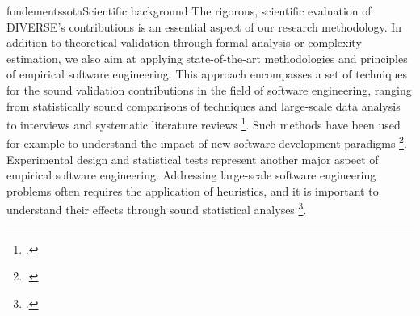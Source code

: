 \documentclass{ra2018}
\newcommand{\team}{DIVERSE}
\begin{document}
\begin{module}{fondements}{sota}{Scientific background}
The rigorous, scientific evaluation of \team{}'s contributions is an essential aspect of our research methodology. In addition to theoretical validation through formal analysis or complexity estimation, we also aim at applying state-of-the-art methodologies and principles of empirical software engineering. This approach encompasses a set of techniques for the sound validation contributions in the field of software engineering, ranging from statistically sound comparisons of techniques and large-scale data analysis to interviews and systematic literature reviews   \footcite{shull2008guide, runeson2009guidelines}. Such methods have been used for example to understand the impact of new software development paradigms   \footcite{briand1999empirical}. Experimental design and statistical tests represent another major aspect of empirical software engineering.  Addressing large-scale software engineering problems often requires the application of heuristics, and it is important to understand their effects through sound statistical analyses   \footcite{ArcuriB11}.

\end{module}
\end{document}
